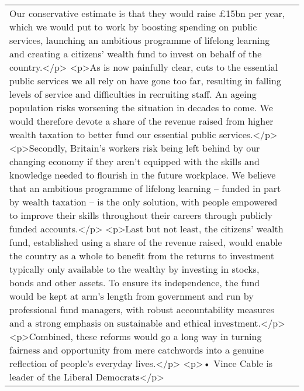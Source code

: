 \documentclass[]{article}
\begin{document}
\begin{table}[!h]
{\begin{tabular}[t]{ll}
Our conservative estimate is that they would raise £15bn per year, which we would put to work by boosting spending on public services, launching an ambitious programme of lifelong learning and creating a citizens’ wealth fund to invest on behalf of the country.</p> <p>As is now painfully clear, cuts to the essential public services we all rely on have gone too far, resulting in falling levels of service and difficulties in recruiting staff. An ageing population risks worsening the situation in decades to come. We would therefore devote a share of the revenue raised from higher wealth taxation to better fund our essential public services.</p> <p>Secondly, Britain’s workers risk being left behind by our changing economy if they aren’t equipped with the skills and knowledge needed to flourish in the future workplace. We believe that an ambitious programme of lifelong learning – funded in part by wealth taxation – is the only solution, with people empowered to improve their skills throughout their careers through publicly funded accounts.</p> <p>Last but not least, the citizens’ wealth fund, established using a share of the revenue raised, would enable the country as a whole to benefit from the returns to investment typically only available to the wealthy by investing in stocks, bonds and other assets. To ensure its independence, the fund would be kept at arm’s length from government and run by professional fund managers, with robust accountability measures and a strong emphasis on sustainable and ethical investment.</p> <p>Combined, these reforms would go a long way in turning fairness and opportunity from mere catchwords into a genuine reflection of people’s everyday lives.</p> <p>• Vince Cable is leader of the Liberal Democrats</p>\\

\end{tabular}}
\end{table}
\end{document}
